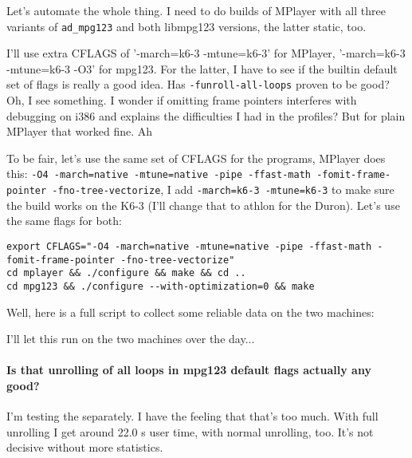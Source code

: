 \documentclass[a4paper,12pt]{scrartcl}
\begin{document}
Let's automate the whole thing. I need to do builds of MPlayer with all three variants of \verb:ad_mpg123: and both libmpg123 versions, the latter static, too.

I'll use extra CFLAGS of '-march=k6-3 -mtune=k6-3' for MPlayer, '-march=k6-3 -mtune=k6-3 -O3' for mpg123. For the latter, I have to see if the builtin default set of flags is really a good idea. Has \verb:-funroll-all-loops: proven to be good? Oh, I see something. I wonder if omitting frame pointers interferes with debugging on i386 and explains the difficulties I had in the profiles? But for plain MPlayer that worked fine. Ah

To be fair, let's use the same set of CFLAGS for the programs, MPlayer does this: \verb:-O4 -march=native -mtune=native -pipe -ffast-math -fomit-frame-pointer -fno-tree-vectorize:, I add \verb:-march=k6-3 -mtune=k6-3: to make sure the build works on the K6-3 (I'll change that to athlon for the Duron). Let's use the same flags for both:

\begin{verbatim}
export CFLAGS="-O4 -march=native -mtune=native -pipe -ffast-math -fomit-frame-pointer -fno-tree-vectorize"
cd mplayer && ./configure && make && cd ..
cd mpg123 && ./configure --with-optimization=0 && make
\end{verbatim}

Well, here is a full script to collect some reliable data on the two machines:

I'll let this run on the two machines over the day...

\paragraph{Is that unrolling of all loops in mpg123 default flags actually any good?}
I'm testing the separately. I have the feeling that that's too much. With full unrolling I get around 22.0 s user time, with normal unrolling, too. It's not decisive without more statistics.
\end{document}
